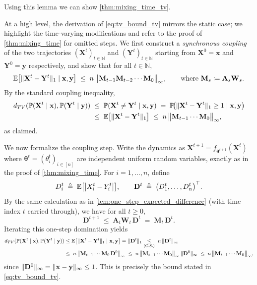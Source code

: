 \documentclass[mnsc,nonblindrev]{informs3}
\newcommand{\NN}{\mathbb{N}}
\newcommand{\Exp}[1]{\mathbb E \left[ #1 \right]} %
\renewcommand{\Pr}{\mathbb{P}}
\newcommand{\Xvec}{\mathbf{X}}
\newcommand{\thetavec}{\mathbf{\theta}}
\newcommand{\Dvec}{\mathbf{D}}
\newcommand{\xvec}{\mathbf{x}}
\newcommand{\Yvec}{\mathbf{Y}}
\newcommand{\yvec}{\mathbf{y}}
\newcommand{\A}{\mathbf{A}}
\newcommand{\W}{\mathbf{W}}
\newcommand{\M}{\mathbf{M}}
\newcommand{\abs}[1]{\left\lvert #1 \right\rvert}
\DeclarePairedDelimiter{\norm}{\lVert}{\rVert}
\let\originalleft\left
\let\originalright\right
\renewcommand{\left}{\mathopen{}\mathclose\bgroup\originalleft}
\renewcommand{\right}{\aftergroup\egroup\originalright}
\renewenvironment{proof}[1][Proof]{%
  \par\noindent{\itshape #1.} \ignorespaces
}{%
  \hfill\Halmos\par
}
\begin{document}
\begin{APPENDICES}
Using this lemma we can show \cref{thm:mixing_time_tv}.
%
%
%
\begin{proof}
At a high level, the derivation of \cref{eq:tv_bound_tv} mirrors the static case; we highlight the time-varying modifications and refer to the proof of \cref{thm:mixing_time} for omitted steps. 
We first construct a \emph{synchronous coupling} of the two trajectories $(\Xvec^t)_{t \in \NN}$ and $(\Yvec^t)_{t \in \NN}$ starting from $\Xvec^0 = \xvec$ and $\Yvec^0 = \yvec$ respectively, and show that for all $t\in\NN$,
\[
\Exp{\|\Xvec^t - \Yvec^t\|_1 \mid \xvec, \yvec} \;\le\; n\,\bigl\| \M_{t-1} \M_{t-2} \cdots \M_{0} \bigr\|_{\infty},
\qquad\text{where } \M_s \coloneqq \A_s \W_s.
\]
By the standard coupling inequality,
\begin{align*}
d_{TV}(\Pr(\Xvec^t \mid \xvec), \Pr(\Yvec^t \mid \yvec)) & \;\le\; \Pr(\Xvec^t \neq \Yvec^t \mid \xvec, \yvec)
\;=\; \Pr\!\bigl(\|\Xvec^t - \Yvec^t\|_1 \ge 1 \mid \xvec, \yvec \bigr) \\
& \;\le\; \Exp{\|\Xvec^t - \Yvec^t\|_1}
\;\le\; n\,\bigl\| \M_{t-1}\cdots \M_{0} \bigr\|_{\infty},
\end{align*}
as claimed.

We now formalize the coupling step. Write the dynamics as $\Xvec^{t+1} = f_{\thetavec^{t+1}}(\Xvec^t)$ where $\thetavec^{t} = (\theta_i^{t})_{i \in [n]}$ are independent uniform random variables, exactly as in the proof of \cref{thm:mixing_time}. For $i=1,\ldots,n$, define
\[
    D_i^{t} \;\triangleq\; \Exp{\abs{X_i^t - Y_i^t}},
    \qquad
    \Dvec^{t} \; \triangleq \; \bigl(D_1^{t},\ldots,D_n^{t}\bigr)^{\top}.
\]
By the same calculation as in \cref{lem:one_step_expected_difference} (with time index $t$ carried through), we have for all $t\ge0$,
\[
    \Dvec^{t+1} \;\leq\; \A_t \W_t\, \Dvec^t \;=\; \M_t\,\Dvec^t.
\]
Iterating this one-step domination yields
\begin{align*}
d_{TV}(\Pr(\Xvec^t \mid \xvec), \Pr(\Yvec^t \mid \yvec))
& \leq \Exp{\|\Xvec^t - \Yvec^t\|_1 \mid \xvec, \yvec}
= \|\Dvec^t\|_1
\underset{(\text{C.S.})}{\leq}\; n\, \|\Dvec^t\|_\infty \\
& \leq\; n\, \bigl\| \M_{t-1} \cdots \M_{0}\, \Dvec^0 \bigr\|_\infty 
\;\leq\; n\, \bigl\| \M_{t-1} \cdots \M_{0} \bigr\|_\infty \, \|\Dvec^0\|_{\infty}
\;\leq\; n\, \bigl\| \M_{t-1} \cdots \M_{0} \bigr\|_\infty,
\end{align*}
since $\|\Dvec^0\|_\infty = \norm{\xvec - \yvec}_{\infty} \le 1$. This is precisely the bound stated in \cref{eq:tv_bound_tv}.



\end{proof}
\end{APPENDICES}
\end{document}
